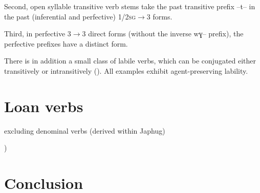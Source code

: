 \documentclass[oldfontcommands,oneside,a4paper,11pt]{article}
\newcommand{\ipa}[1]{{\phon \mbox{#1}}} %
\begin{document}
 Second, open syllable transitive verb stems take the past transitive prefix \ipa{--t--} in the past (inferential and perfective) \textsc{1/2sg}$\rightarrow$3 forms. 
 
 
 Third, in perfective 3$\rightarrow$3 direct forms (without the inverse \ipa{wɣ--} prefix), the perfective prefixes have a distinct form.

There is in addition a small class of labile verbs, which can be conjugated either transitively or intransitively (\citealt{jacques12demotion}). All examples exhibit agent-preserving  lability.
  
  
  \section{Loan verbs}
  
  excluding denominal verbs (derived within Japhug)
  
  
\citealt[133-140]{jacques04these})  
  
%
%
%
%
%
%
% 
%
%
%
%
% 
%
%
%
%
%
% 

  \section{Conclusion}
  


\end{document}
